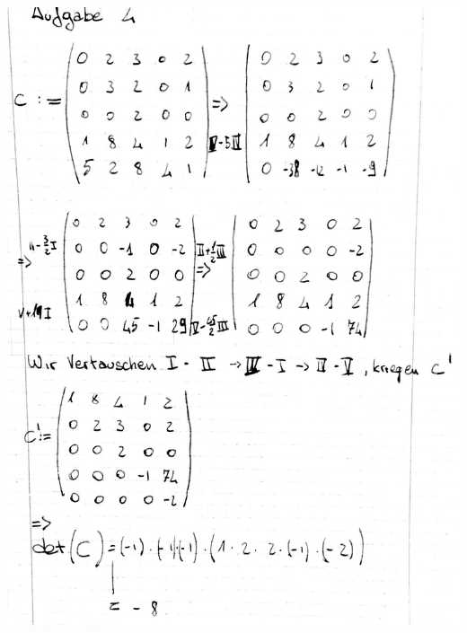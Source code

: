 \documentclass[10pt,a4paper]{article}
\begin{document}
\includegraphics[scale=0.2]{la_t12_7.jpg} \\
\end{document}
